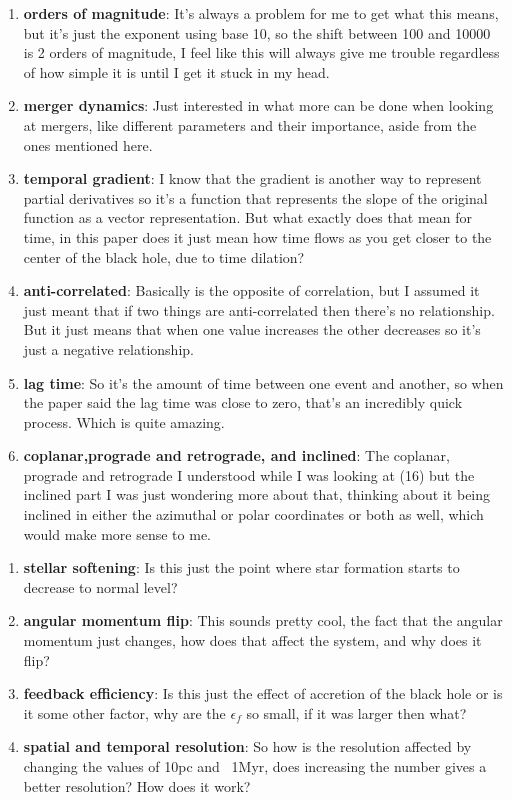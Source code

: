 \documentclass{article}
\begin{document}
\begin{enumerate}
	\item \textbf{orders of magnitude}: It's always a problem for me to get what this means, but it's just the exponent using base 10, so the shift between 100 and 10000 is 2 orders of magnitude, I feel like this will always give me trouble regardless of how simple it is until I get it stuck in my head.
	\item \textbf{merger dynamics}: Just interested in what more can be done when looking at mergers, like different parameters and their importance, aside from the ones mentioned here.
	\item \textbf{temporal gradient}: I know that the gradient is another way to represent partial derivatives so it's a function that represents the slope of the original function as a vector representation. But what exactly does that mean for time, in this paper does it just mean how time flows as you get closer to the center of the black hole, due to time dilation?
	\item \textbf{anti-correlated}: Basically is the opposite of correlation, but I assumed it just meant that if two things are anti-correlated then there's no relationship. But it just means that when one value increases the other decreases so it's just a negative relationship.
	\item \textbf{lag time}: So it's the amount of time between one event and another, so when the paper said the lag time was close to zero, that's an incredibly quick process. Which is quite amazing.
	\item \textbf{coplanar,prograde and retrograde, and inclined}: The coplanar, prograde and retrograde I understood while I was looking at (16) but the inclined part I was just wondering more about that, thinking about it being inclined in either the azimuthal or polar coordinates or both as well, which would make more sense to me.
\end{enumerate}
\begin{enumerate}
	\item \textbf{stellar softening}: Is this just the point where star formation starts to decrease to normal level?
	\item \textbf{angular momentum flip}: This sounds pretty cool, the fact that the angular momentum just changes, how does that affect the system, and why does it flip?
	\item \textbf{feedback efficiency}: Is this just the effect of accretion of the black hole or is it some other factor, why are the $\epsilon{_f}$ so small, if it was larger then what?
	\item \textbf{spatial and temporal resolution}: So how is the resolution affected by changing the values of 10pc and ~1Myr, does increasing the number gives a better resolution? How does it work? 
\end{enumerate}
\end{document}

